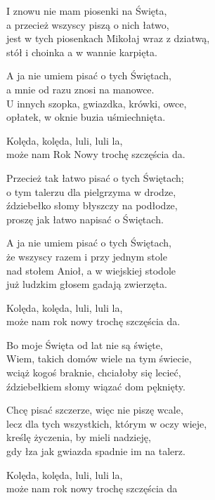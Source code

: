 \begin{text}
    I znowu nie mam piosenki na Święta,\\
    a przecież wszyscy piszą o nich łatwo,\\
    jest w tych piosenkach Mikołaj wraz z dziatwą,\\
    stół i choinka a w wannie karpięta.

    A ja nie umiem pisać o tych Świętach,\\
    a mnie od razu znosi na manowce.\\
    U innych szopka, gwiazdka, krówki, owce,\\
    opłatek, w oknie buzia uśmiechnięta.

    Kolęda, kolęda, luli, luli la,\\
    może nam Rok Nowy trochę szczęścia da.

    Przecież tak łatwo pisać o tych Świętach;\\
    o tym talerzu dla pielgrzyma w drodze,\\
    ździebełko słomy błyszczy na podłodze,\\
    proszę jak łatwo napisać o Świętach.

    A ja nie umiem pisać o tych Świętach,\\
    że wszyscy razem i przy jednym stole\\
    nad stołem Anioł, a w wiejskiej stodole\\
    już ludzkim głosem gadają zwierzęta.

    Kolęda, kolęda, luli, luli la,\\
    może nam rok nowy trochę szczęścia da.

    Bo moje Święta od lat nie są święte,\\
    Wiem, takich domów wiele na tym świecie,\\
    wciąż kogoś braknie, chciałoby się lecieć,\\
    ździebełkiem słomy wiązać dom pęknięty.

    Chcę pisać szczerze, więc nie piszę wcale,\\
    lecz dla tych wszystkich, którym w oczy wieje,\\
    kreślę życzenia, by mieli nadzieję,\\
    gdy łza jak gwiazda spadnie im na talerz.

    Kolęda, kolęda, luli, luli la,\\
    może nam rok nowy trochę szczęścia da
\end{text}
\begin{chord}

\end{chord}